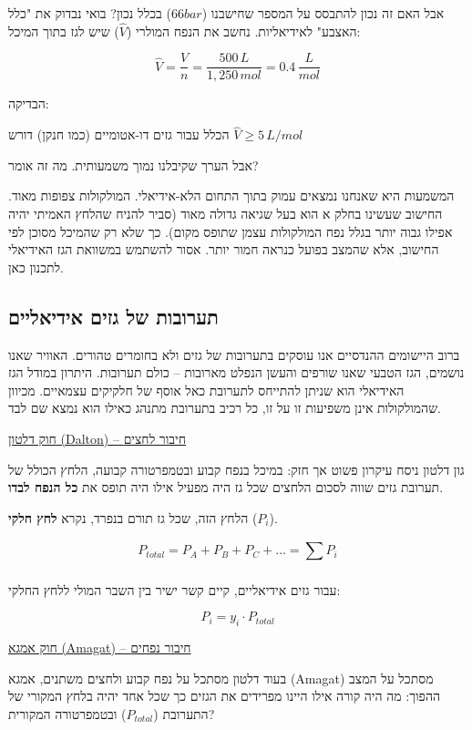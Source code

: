 \documentclass[
  hebrew,
  letterpaper,
  DIV=11,
  numbers=noendperiod]{scrreprt}
\begin{document}
אבל האם זה נכון להתבסס על המספר שחישבנו (\(66bar\)) בכלל נכון? בואי
נבדוק את "כלל האצבע" לאידיאליות. נחשב את הנפח המולרי (\(\widehat{V}\))
שיש לגז בתוך המיכל:

\[\widehat{V} = \frac{V}{n} = \frac{500\, L}{1,250\, mol} = 0.4\,\frac{L}{mol}\]

הבדיקה:

הכלל עבור גזים דו-אטומיים (כמו חנקן) דורש
\(\widehat{V} \geq 5\, L\text{/}mol\)

אבל הערך שקיבלנו נמוך משמעותית. מה זה אומר?

המשמעות היא שאנחנו נמצאים עמוק בתוך התחום הלא-אידיאלי. המולקולות צפופות
מאוד. החישוב שעשינו בחלק א\textquotesingle{} הוא בעל שגיאה גדולה מאוד
(סביר להניח שהלחץ האמיתי יהיה אפילו גבוה יותר בגלל נפח המולקולות עצמן
שתופס מקום). כך שלא רק שהמיכל מסוכן לפי החישוב, אלא שהמצב בפועל כנראה
חמור יותר. אסור להשתמש במשוואת הגז האידיאלי לתכנון כאן.

\subsection{תערובות של גזים
אידיאליים}\label{ux5eaux5e2ux5e8ux5d5ux5d1ux5d5ux5ea-ux5e9ux5dc-ux5d2ux5d6ux5d9ux5dd-ux5d0ux5d9ux5d3ux5d9ux5d0ux5dcux5d9ux5d9ux5dd}

ברוב היישומים ההנדסיים אנו עוסקים בתערובות של גזים ולא בחומרים טהורים.
האוויר שאנו נושמים, הגז הטבעי שאנו שורפים והעשן הנפלט מארובות -- כולם
תערובות. היתרון במודל הגז האידיאלי הוא שניתן להתייחס לתערובת כאל אוסף של
חלקיקים עצמאיים. מכיוון שהמולקולות אינן משפיעות זו על זו, כל רכיב
בתערובת מתנהג כאילו הוא נמצא שם לבד.

\ul{חוק דלטון (Dalton) -- חיבור לחצים}

ג\textquotesingle ון דלטון ניסח עיקרון פשוט אך חזק: במיכל בנפח קבוע
ובטמפרטורה קבועה, הלחץ הכולל של תערובת גזים שווה לסכום הלחצים שכל גז היה
מפעיל אילו היה תופס את \textbf{כל הנפח לבדו}.

הלחץ הזה, שכל גז תורם בנפרד, נקרא \textbf{לחץ חלקי} (\(P_{i}\)).

\[P_{total} = P_{A} + P_{B} + P_{C} + \ldots = \sum_{}^{}P_{i}\]

עבור גזים אידיאליים, קיים קשר ישיר בין השבר המולי ללחץ החלקי:

\[P_{i} = y_{i} \cdot P_{total}\]

\ul{חוק אמגא (Amagat) -- חיבור נפחים}

בעוד דלטון מסתכל על נפח קבוע ולחצים משתנים, אמגא (Amagat) מסתכל על המצב
ההפוך: מה היה קורה אילו היינו מפרידים את הגזים כך שכל אחד יהיה בלחץ
המקורי של התערובת (\(P_{total}\)) ובטמפרטורה המקורית?
\end{document}
